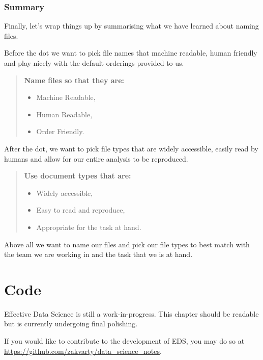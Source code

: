 \documentclass[
  12pt,
]{book}
\providecommand{\tightlist}{%
  \setlength{\itemsep}{0pt}\setlength{\parskip}{0pt}}
\begin{document}
\hypertarget{summary}{%
\subsection{Summary}\label{summary}}

Finally, let's wrap things up by summarising what we have learned about naming files.

Before the dot we want to pick file names that machine readable, human friendly and play nicely with the default orderings provided to us.

\begin{quote}
\textbf{Name files so that they are:}

\begin{itemize}
\tightlist
\item
  Machine Readable,
\item
  Human Readable,
\item
  Order Friendly.
\end{itemize}
\end{quote}

After the dot, we want to pick file types that are widely accessible, easily read by humans and allow for our entire analysis to be reproduced.

\begin{quote}
\textbf{Use document types that are:}

\begin{itemize}
\tightlist
\item
  Widely accessible,
\item
  Easy to read and reproduce,
\item
  Appropriate for the task at hand.
\end{itemize}
\end{quote}

Above all we want to name our files and pick our file types to best match with the team we are working in and the task that we is at hand.

\hypertarget{workflows-code}{%
\chapter{Code}\label{workflows-code}}

Effective Data Science is still a work-in-progress. This chapter should be readable but is currently undergoing final polishing.

If you would like to contribute to the development of EDS, you may do so at \url{https://github.com/zakvarty/data_science_notes}.
\end{document}
